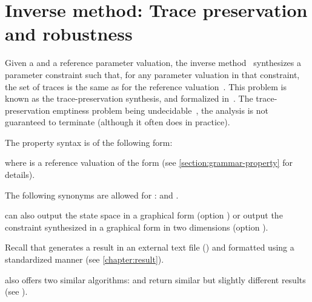 \section{Inverse method: Trace preservation and robustness}\label{ss:mode:IM}

Given a \NIPTA{} and a reference parameter valuation, the inverse method~\IM{} synthesizes a parameter constraint such that, for any parameter valuation in that constraint, the set of traces is the same as for the reference valuation~\cite{ACEF09}.
This problem is known as the trace-preservation synthesis, and formalized in~\cite{AM15}.
The trace-preservation emptiness problem being undecidable~\cite{AM15}, the analysis is not guaranteed to terminate (although it often does in practice).

The property syntax is of the following form:


\noindent{}
where  is a reference valuation of the form  (see \cref{section:grammar-property} for details).

\begin{remark}
	The following synonyms are allowed for :  and .
\end{remark}


\imitator{} can also
output the state space in a graphical form (option )
or
output the constraint synthesized in a graphical form in two dimensions (option ).

Recall that \imitator{} %
generates
a result in an external text file () and formatted using a standardized manner (see \cref{chapter:result}). %


\imitator{} also offers two similar algorithms:  and  return similar but slightly different results (see \cite{AS11}).



